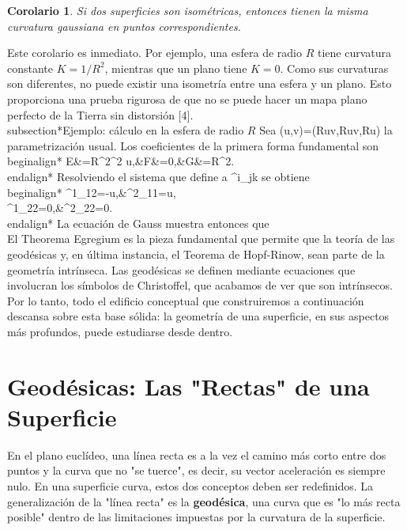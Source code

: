 \documentclass[12pt, a4paper]{report}
\newcommand{\Christoffel}[3]{\Gamma^{#1}_{#2#3}}
\theoremstyle{miestilo}
\newtheorem{corolario}[teorema]{Corolario}
\theoremstyle{midefinicion}
\begin{document}
\begin{corolario}
Si dos superficies son isométricas, entonces tienen la misma curvatura gaussiana en puntos correspondientes.
\end{corolario}

Este corolario es inmediato. Por ejemplo, una esfera de radio $R$ tiene curvatura constante $K = 1/R^2$, mientras que un plano tiene $K=0$. Como sus curvaturas son diferentes, no puede existir una isometría entre una esfera y un plano. Esto proporciona una prueba rigurosa de que no se puede hacer un mapa plano perfecto de la Tierra sin distorsión [4].
\\subsection*{Ejemplo: c\'alculo en la esfera de radio $R$}
Sea \varphi(u,v)=(R\cos u\cos v,R\cos u\sin v,R\sin u) la parametrizaci\'on usual. Los coeficientes de la primera forma fundamental son
\\begin{align*}
E&=R^2\cos^2 u,&F&=0,&G&=R^2.
\\end{align*}
Resolviendo el sistema que define a \Christoffel{i}{j}{k} se obtiene
\\begin{align*}
\Christoffel{1}{1}{2}=-\tan u,&\quad \Christoffel{2}{1}{1}=\tan u,\\
\Christoffel{1}{2}{2}=0,&\quad \Christoffel{2}{2}{2}=0.
\\end{align*}
La ecuaci\'on de Gauss muestra entonces que
\\[
K=\frac{1}{R^2}.
\\]

El Theorema Egregium es la pieza fundamental que permite que la teoría de las geodésicas y, en última instancia, el Teorema de Hopf-Rinow, sean parte de la geometría intrínseca. Las geodésicas se definen mediante ecuaciones que involucran los símbolos de Christoffel, que acabamos de ver que son intrínsecos. Por lo tanto, todo el edificio conceptual que construiremos a continuación descansa sobre esta base sólida: la geometría de una superficie, en sus aspectos más profundos, puede estudiarse desde dentro.

\chapter{Geodésicas: Las "Rectas" de una Superficie}

En el plano euclídeo, una línea recta es a la vez el camino más corto entre dos puntos y la curva que no "se tuerce", es decir, su vector aceleración es siempre nulo. En una superficie curva, estos dos conceptos deben ser redefinidos. La generalización de la "línea recta" es la \textbf{geodésica}, una curva que es "lo más recta posible" dentro de las limitaciones impuestas por la curvatura de la superficie.
\end{document}
